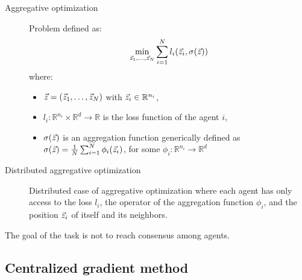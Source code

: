 \begin{description}
    \item[Aggregative optimization] 
        Problem defined as:
        \[
            \min_{{\vec{z}}_1, \dots, {\vec{z}}_N} \sum_{i=1}^{N} l_i({\vec{z}}_i, \sigma({\vec{z}}))
        \]
        where:
        \begin{itemize}
            \item ${\vec{z}} = ({\vec{z}}_1, \dots, {\vec{z}}_N)$ with ${\vec{z}}_i \in \mathbb{R}^{n_i}$,
            \item $l_i: \mathbb{R}^{n_i} \times \mathbb{R}^d \rightarrow \mathbb{R}$ is the loss function of the agent $i$,
            \item $\sigma({\vec{z}})$ is an aggregation function generically defined as $\sigma({\vec{z}}) = \frac{1}{N} \sum_{i=1}^{N} \phi_i({\vec{z}}_i)$, for some $\phi_i: \mathbb{R}^{n_i} \rightarrow \mathbb{R}^d$
        \end{itemize}

    \item[Distributed aggregative optimization] 
        Distributed case of aggregative optimization where each agent has only access to the loss $l_i$, the operator of the aggregation function $\phi_i$, and the position ${\vec{z}}_i$ of itself and its neighbors.
\end{description}

\begin{remark}
    The goal of the task is not to reach consensus among agents.
\end{remark}


\subsection{Centralized gradient method}

